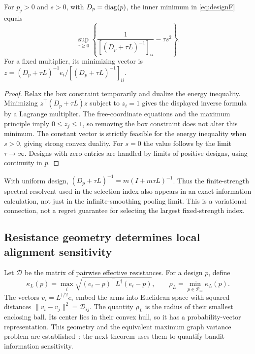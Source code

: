 \begin{lemma}
For $p_j>0$ and $s>0$, with $D_p=\operatorname{diag}(p)$, the inner minimum in \eqref{eq:designF} equals
\begin{equation}
 \sup_{\tau\ge0}\left\{
 \frac{1}{[(D_p+\tau L)^{-1}]_{ii}}-\tau s^2\right\}.
 \label{eq:resolventoracle}
\end{equation}
For a fixed multiplier, its minimizing vector is
$z=(D_p+\tau L)^{-1}e_i/[(D_p+\tau L)^{-1}]_{ii}$.
\label{lem:resolvent}
\end{lemma}
\begin{proof}
Relax the box constraint temporarily and dualize the energy inequality. Minimizing $z^\top(D_p+\tau L)z$ subject to $z_i=1$ gives the displayed inverse formula by a Lagrange multiplier. The free-coordinate equations and the maximum principle imply $0\le z_j\le1$, so removing the box constraint does not alter this minimum. The constant vector is strictly feasible for the energy inequality when $s>0$, giving strong convex duality. For $s=0$ the value follows by the limit $\tau\to\infty$. Designs with zero entries are handled by limits of positive designs, using continuity in $p$.
\end{proof}
With uniform design, $(D_p+\tau L)^{-1}=m(I+m\tau L)^{-1}$. Thus the finite-strength spectral resolvent used in the selection index also appears in an exact information calculation, not just in the infinite-smoothing pooling limit. This is a variational connection, not a regret guarantee for selecting the largest fixed-strength index.

\subsection{Resistance geometry determines local alignment sensitivity}
Let $\mathcal D$ be the matrix of pairwise effective resistances. For a design $p$, define
\begin{equation}
 \kappa_L(p)=\max_i\sqrt{(e_i-p)^\top L^\dagger(e_i-p)},\qquad
 \rho_L=\min_{p\in\mathscr P_m}\kappa_L(p).
 \label{eq:radiusdesign}
\end{equation}
The vectors $v_i=L^{\dagger/2}e_i$ embed the arms into Euclidean space with squared distances $\|v_i-v_j\|^2=\mathcal D_{ij}$. The quantity $\rho_L$ is the radius of their smallest enclosing ball. Its center lies in their convex hull, so it has a probability-vector representation. This geometry and the equivalent maximum graph variance problem are established~\cite{devriendt2022}; the next theorem uses them to quantify bandit information sensitivity.

